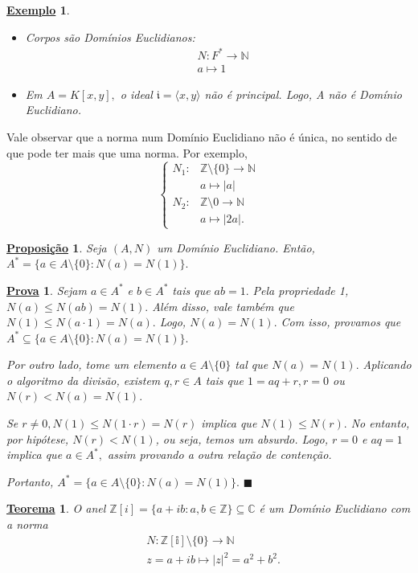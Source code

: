 \documentclass{article}
\newtheorem*{theorem*}{\underline{Teorema}}
\newtheorem*{prop*}{\underline{Proposi\c c\~ao}}
\newtheorem{example}{\underline{Exemplo}}
\newtheorem*{proof*}{\underline{Prova}}
\renewcommand\qedsymbol{$\blacksquare$}
\begin{document}
\begin{example}
 \begin{itemize}
  \item[1)] Corpos são Domínios Euclidianos:
  \begin{align*}
    &N:F^{*}\rightarrow \mathbb{N}\\
    &a\mapsto 1
  \end{align*}
  \item[2)] Em \(A = K[x, y],\) o ideal \(\mathfrak{i} = \langle x, y \rangle\) não é principal. Logo, A não é Domínio Euclidiano.
 \end{itemize}
\end{example}
  Vale observar que a norma num Domínio Euclidiano não é única, no sentido de que pode ter mais que uma norma. Por exemplo,
  \[
    \left\{\begin{array}{ll}
      N_{1}:&\mathbb{Z}\setminus{\{0\}}\rightarrow \mathbb{N}\\
            &a\mapsto |a|\\
      N_{2}:&\mathbb{Z}\setminus{0}\rightarrow \mathbb{N}\\
            &a\mapsto |2a|.
    \end{array}\right.
  \]
 \begin{prop*}
  Seja \((A, N)\) um Domínio Euclidiano. Então, \(A^{*}=\{a\in A\setminus{\{0\}}: N(a) = N(1)\}.\)
 \end{prop*}
 \begin{proof*}
  Sejam \(a\in A^{*}\) e \(b\in A^{*}\) tais que \(ab = 1.\) Pela propriedade 1,
 \(N(a)\leq N(ab) = N(1).\) Além disso, vale também que \(N(1)\leq N(a \cdot 1) = N(a).\) Logo,
 \(N(a) = N(1).\) Com isso, provamos que \(A^{*}\subseteq{\{a\in A\setminus{\{0\}}: N(a) = N(1)\}}.\)

  Por outro lado, tome um elemento \(a\in A\setminus{\{0\}}\) tal que \(N(a) = N(1).\) Aplicando o algoritmo da divisão,
existem \(q, r\in A\) tais que \(1 = aq + r, r = 0\) ou \(N(r) < N(a) = N(1).\)

  Se \(r\neq0, N(1)\leq N(1 \cdot r) = N(r)\) implica que \(N(1)\leq N(r).\) No entanto, por hipótese,
 \(N(r) < N(1)\), ou seja, temos um absurdo. Logo, \(r = 0\) e \(aq = 1\) implica que \(a\in A^{*},\) assim provando
a outra relação de contenção.

  Portanto, \(A^{*}=\{a\in A\setminus{\{0\}}: N(a) = N(1)\}.\) \qedsymbol
 \end{proof*}
 \begin{theorem*}
  O anel \(\mathbb{Z}[i] = \{a + ib: a, b\in \mathbb{Z}\}\subseteq{\mathbb{C}}\) é um Domínio Euclidiano com a norma
 \begin{align*}
   &N:\mathbb{Z[i]}\setminus{\{0\}}\rightarrow \mathbb{N}\\
   &z = a + ib\mapsto |z|^{2} = a^{2} + b^{2}.
 \end{align*}
 \end{theorem*}
\end{document}
